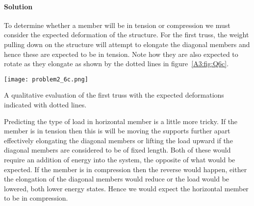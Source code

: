 \documentclass[a4paper,justified,oneside]{tufte-handout}
\numberwithin{equation}{subsection}
\begin{document}
\begin{solution}
\paragraph{Solution}
To determine whether a member will be in tension or compression we must consider the expected deformation of the structure. For the first truss, the weight pulling down on the structure will attempt to elongate the diagonal members and hence these are expected to be in tension. Note how they are also expected to rotate as they elongate as shown by the dotted lines in figure~\ref{A3:fig:Q6c}.
\begin{marginfigure}[20mm]
	\centering
	\texttt{[image: problem2\_6c.png]}
	\caption{A qualitative evaluation of the first truss with the expected deformations indicated with dotted lines.}
	\label{A3:fig:Q6c}
\end{marginfigure}

Predicting the type of load in horizontal member is a little more tricky. If the member is in tension then this is will be moving the supports further apart effectively elongating the diagonal members or lifting the load upward if the diagonal members are considered to be of fixed length. Both of these would require an addition of energy into the system, the opposite of what would be expected. If the member is in compression then the reverse would happen, either the elongation of the diagonal members would reduce or the load would be lowered, both lower energy states. Hence we would expect the horizontal member to be in compression.


\end{solution}
\end{document}
